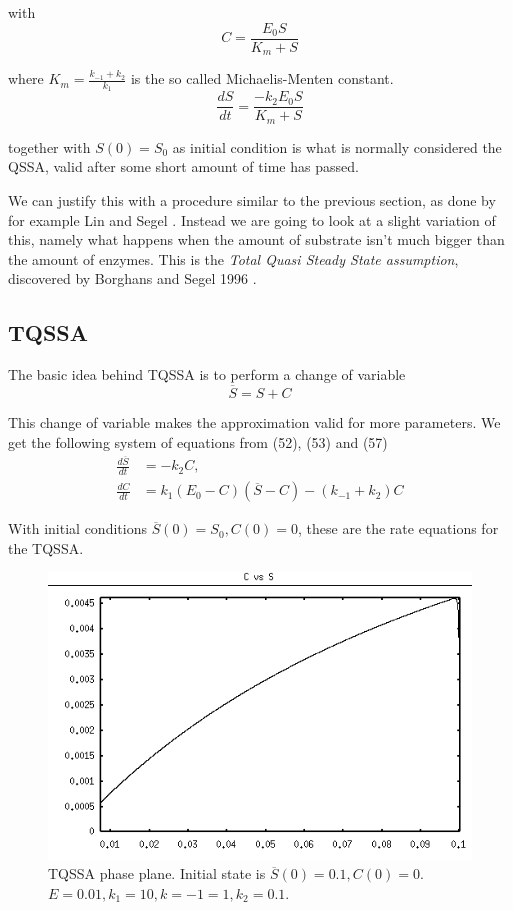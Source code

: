 \documentclass[12pt]{article}
\begin{document}
with
\begin{equation}
C = \frac{E_0 S}{K_m +S}
\end{equation}

where $K_m = \frac{k_{-1} + k_2}{k_1}$ is the so called {Michaelis-Menten
constant}.
\begin{equation}
\frac{dS}{dt} = \frac{-k_2 E_0 S}{K_m + S}
\end{equation}

together with $S(0) = S_0$ as initial condition is what is normally considered
the QSSA, valid after some short amount of time has passed.

We can justify this with a procedure similar to the previous section, as done by
for example Lin and Segel \cite{lin1974mathematics}. Instead we are going to
look at a slight variation of this, namely what happens when the amount of
substrate isn't much bigger than the amount of enzymes. This is the
\textit{Total Quasi Steady State assumption}, discovered by Borghans and Segel
1996 \cite{borghans1996extending}.

\subsection{TQSSA}

The basic idea behind TQSSA is to perform a change of variable
\begin{equation}
\overline{S} = S + C
\end{equation}

This change of variable makes the approximation valid for more parameters. We
get the following system of equations from (52), (53) and (57)
\begin{align}
\frac{d\overline{S}}{dt} &= - k_2 C, \\
\frac{dC}{dt} &= k_1(E_0-C)(\overline{S}-C)-(k_{-1}+ k_2) C
\end{align}

With initial conditions $\overline{S}(0)=S_0, C(0)=0$, these are the rate
equations for the TQSSA.
\begin{figure}[ht!]
\centering
\includegraphics[width=120mm]
{tqssa-phase-plane-b.png}
\caption{TQSSA phase plane. Initial state is $\overline{S}(0)=0.1,
  C(0)=0$. $E=0.01, k_1=10, k={-1}=1, k_2=0.1$.}
\label{overflow}
\end{figure}
\end{document}
